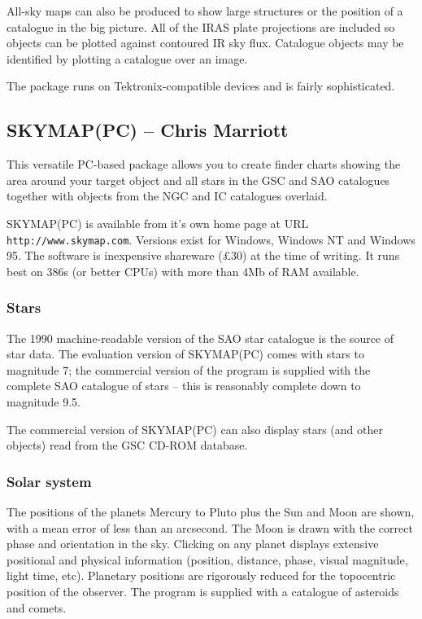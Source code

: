 \documentclass[twoside,11pt]{article}
\newcommand{\htmladdnormallink}[2]{#1}
\newcommand{\xlabel}[1]{}
\newcommand{\SKYMAPPCref}{\htmladdnormallink{SKYMAP(PC)}{http://www.skymap.com}}
\newcommand{\GSCref}{\htmladdnormallink{GSC}{http://www-gsss.stsci.edu/casbhome.html}}
\newcommand{\HTTPCref}{\htmladdnormallink{\tt http://www.skymap.com}{http://www.skymap.com}}
\begin{document}
All-sky maps can also be produced to show large structures or
the position of a catalogue in the big picture. All of the IRAS plate projections
 are included so objects can be plotted
against contoured IR sky flux. Catalogue objects may be identified by 
plotting a catalogue over an image.

The package runs on Tektronix-compatible devices and is fairly sophisticated. 


\subsection{{\SKYMAPPCref} -- Chris Marriott} \xlabel{SKYMAPPC}
\label{sec:skymappc}

This versatile PC-based package allows you to create finder charts showing
the area around your target object and all stars in the {\GSCref} and SAO
catalogues together with objects from the NGC and IC catalogues overlaid. 

{\SKYMAPPCref} is available from it's own home page at 
URL {\HTTPCref}. Versions exist for Windows, Windows NT and Windows 95. 
The software is inexpensive shareware (\pounds 30) at the time
of writing. It runs best on 386s (or better CPUs) with more than 4Mb of RAM
available. 


\subsubsection{Stars} 

The 1990 machine-readable version of the SAO star catalogue is the source of
star data. The evaluation version of {\SKYMAPPCref} comes with stars to magnitude 7;
the commercial version of the program is supplied with the complete SAO
catalogue of stars -- this is reasonably complete down to magnitude 9.5.

The commercial version of {\SKYMAPPCref} can also display stars (and other objects)
read from the {\GSCref} CD-ROM database.

\subsubsection{Solar system} 

The positions of the planets Mercury to Pluto plus the Sun and Moon are
shown, with a mean error of less than an arcsecond. The Moon is drawn with
the correct phase and orientation in the sky. Clicking on any planet displays
extensive positional and physical information (position, distance, phase,
visual magnitude, light time, etc). Planetary positions are rigorously
reduced for the topocentric position of the observer. 
The program is supplied with a catalogue of asteroids and comets.
\end{document}
